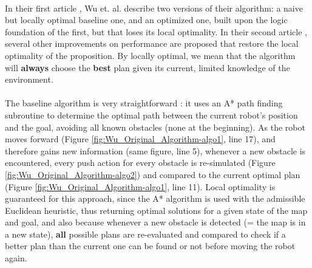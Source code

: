\paragraph{} In their first article \parencite{wu_navigation_2010}, Wu et. al. describe two versions of their algorithm: a naive but locally optimal baseline one, and an optimized one, built upon the logic foundation of the first, but that loses its local optimality. In their second article \parencite{levihn_locally_2014}, several other improvements on performance are proposed that restore the local optimality of the proposition. By locally optimal, we mean that the algorithm will \textbf{always} choose the \textbf{best} plan given its current, limited knowledge of the environment.

\paragraph{} The baseline algorithm is very straightforward : it uses an A* path finding subroutine to determine the optimal path between the current robot's position and the goal, avoiding all known obstacles (none at the beginning). As the robot moves forward (Figure \ref{fig:Wu_Original_Algorithm-algo1}, line 17), and therefore gains new information (same figure, line 5), whenever a new obstacle is encountered, every push action for every obstacle is re-simulated (Figure \ref{fig:Wu_Original_Algorithm-algo2}) and compared to the current optimal plan (Figure \ref{fig:Wu_Original_Algorithm-algo1}, line 11). Local optimality is guaranteed for this approach, since the A* algorithm is used with the admissible Euclidean heuristic, thus returning optimal solutions for a given state of the map and goal, and also because whenever a new obstacle is detected (= the map is in a new state), \textbf{all} possible plans are re-evaluated and compared to check if a better plan than the current one can be found or not before moving the robot again.

